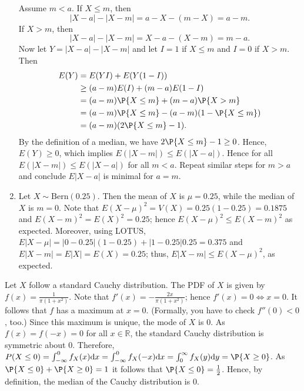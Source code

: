 \begin{Solution}{1.3}
\begin{enumerate}
				Assume $m < a$. If $X \leq m$, then
				\begin{equation*}
					|X - a| - |X - m| = a - X - (m - X) = a - m.
				\end{equation*}
				If $X > m$, then
				\begin{equation*}
					|X - a| - |X - m| = X - a - (X - m) = m - a.
				\end{equation*}
				Now let $Y = |X - a| - |X - m|$ and let $I = 1$ if $X \leq m$ and $I = 0$ if $X > m$. Then
				\begin{align*}
					E(Y) & = E(YI) + E(Y(1 - I)) \\
					& \geq (a - m) E(I)	+ (m - a) E(1 - I) \\
					& = (a - m) \P{X \leq m} + (m - a) \P{X > m} \\
					& = (a - m) \P{X \leq m} - (a - m) (1 - \P{X \leq m}) \\
					& = (a - m) (2 \P{X \leq m} - 1).
				\end{align*}
				By the definition of a median, we have $2 \P{X \leq m} - 1 \geq 0$. Hence, $E(Y) \geq 0$, which implies $E(|X - m|) \leq E(|X - a|)$. Hence for all $E(|X - m|) \leq E(|X - a|)$ for all $m < a$. Repeat similar steps for $m > a$ and conclude $E|X - a|$ is minimal for $a = m$.
				\item Let $X \sim \text{Bern}(0.25)$. Then the mean of $X$ is $\mu = 0.25$, while the median of $X$ is $m = 0$. Note that $E(X - \mu)^2 = V(X) = 0.25(1 - 0.25) = 0.1875$ and $E(X - m)^2 = E(X)^2 = 0.25$; hence $E(X - \mu)^2 \leq E(X - m)^2$ as expected. Moreover, using LOTUS, $E|X - \mu| = |0 - 0.25|(1 - 0.25) + |1 - 0.25|0.25 = 0.375$ and $E|X - m| = E|X| = E(X) = 0.25$; thus, $E|X - m| \leq E(X - \mu)^2$, as expected.
			\end{enumerate}
		
\end{Solution}
\begin{Solution}{1.5}
			Let $X$ follow a standard Cauchy distribution. The PDF of $X$ is given by $f(x) = \frac{1}{\pi (1 + x^2)}$. Note that $f'(x) = -\frac{2x}{\pi (1 + x^2)}$; hence $f'(x) = 0 \iff x = 0$. It follows that $f$ has a maximum at $x = 0$. (Formally, you have to check $f''(0) < 0$, too.) Since this maximum is unique, the mode of $X$ is $0$. As $f(x) = f(-x) = 0$ for all $x \in \mathbb{R}$, the standard Cauchy distribution is symmetric about $0$. Therefore, $P(X \leq 0) = \int_{-\infty}^0 f_X(x) \mathrm{d}x = \int_{-\infty}^0 f_X(-x) \mathrm{d}x = \int_0^{\infty} f_X(y) \mathrm{d}y = \P{X \geq 0}$. As $\P{X \leq 0} + \P{X \geq 0} = 1$ it follows that $\P{X \leq 0} = \frac{1}{2}$. Hence, by definition, the median of the Cauchy distribution is $0$.
		
\end{Solution}
